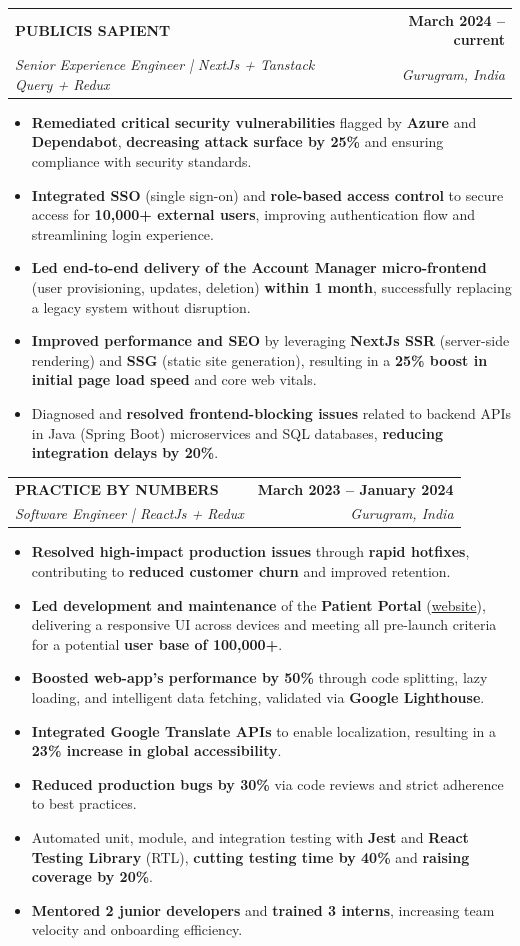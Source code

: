 \documentclass[letterpaper,12pt]{article}
\makeatletter
\newcommand{\resumeItem}[1]{
  \item\small{
    {#1 \vspace{-2pt}}
  }
}
\newcommand{\resumeSubheading}[4]{
  \vspace{-2pt}\item
    \begin{tabular*}{1.0\textwidth}[t]{l@{\extracolsep{\fill}}r}
      \textbf{#1} & \textbf{\small #2} \\
      \textit{\small#3} & \textit{\small #4} \\
    \end{tabular*}\vspace{-7pt}
}
\newcommand{\resumeItemListStart}{\begin{itemize}}
\newcommand{\resumeItemListEnd}{\end{itemize}\vspace{-5pt}}
\makeatother
\begin{document}
  \resumeSubheading
      {PUBLICIS SAPIENT}{March 2024 -- current}
      {Senior Experience Engineer | NextJs + Tanstack Query + Redux}{Gurugram, India}
      \resumeItemListStart
        \resumeItem{\textbf{Remediated critical security vulnerabilities} flagged by \textbf{Azure} and \textbf{Dependabot}, \textbf{decreasing attack surface by 25\%} and ensuring compliance with security standards.}
        \resumeItem{\textbf{Integrated SSO} (single sign-on) and \textbf{role-based access control} to secure access for \textbf{10,000+ external users}, improving authentication flow and streamlining login experience.}
        \resumeItem{\textbf{Led end-to-end delivery of the Account Manager micro-frontend} (user provisioning, updates, deletion) \textbf{within 1 month}, successfully replacing a legacy system without disruption.}
        \resumeItem{\textbf{Improved performance and SEO} by leveraging \textbf{NextJs SSR} (server-side rendering) and \textbf{SSG} (static site generation), resulting in a \textbf{25\% boost in initial page load speed} and core web vitals.}
        \resumeItem{Diagnosed and \textbf{resolved frontend-blocking issues} related to backend APIs in Java (Spring Boot) microservices and SQL databases, \textbf{reducing integration delays by 20\%}.}
    \resumeItemListEnd

   \resumeSubheading
      {PRACTICE BY NUMBERS}{March 2023 -- January 2024}
      {Software Engineer | ReactJs + Redux}{Gurugram, India}
      \resumeItemListStart
        \resumeItem{\textbf{Resolved high-impact production issues} through \textbf{rapid hotfixes}, contributing to \textbf{reduced customer churn} and improved retention.}
        \resumeItem{\textbf{Led development and maintenance} of the \textbf{Patient Portal} (\href{https://practicenumbers.com/}{website}), delivering a responsive UI across devices and meeting all pre-launch criteria for a potential \textbf{user base of 100,000+}.}
        \resumeItem{\textbf{Boosted web-app's performance by 50\%} through code splitting, lazy loading, and intelligent data fetching, validated via \textbf{Google Lighthouse}.}
        \resumeItem{\textbf{Integrated Google Translate APIs} to enable localization, resulting in a \textbf{23\% increase in global accessibility}.}
        \resumeItem{\textbf{Reduced production bugs by 30\%} via code reviews and strict adherence to best practices.}
        \resumeItem{Automated unit, module, and integration testing with \textbf{Jest} and \textbf{React Testing Library} (RTL), \textbf{cutting testing time by 40\%} and \textbf{raising coverage by 20\%}.}
        \resumeItem{\textbf{Mentored 2 junior developers} and \textbf{trained 3 interns}, increasing team velocity and onboarding efficiency.}
    \resumeItemListEnd
\end{document}
